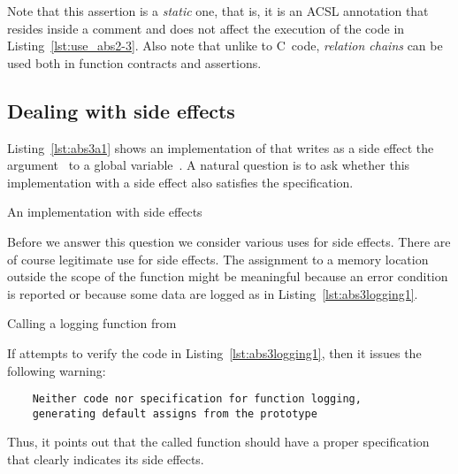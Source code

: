 Note that this assertion is a \emph{static} one, that is, it is
an ACSL annotation that resides inside a comment and does not affect
the execution of the code in Listing~\ref{lst:use_abs2-3}.
Also note that unlike to C~code, \emph{relation chains} can be used both in function
contracts and assertions.

\clearpage

\subsection{Dealing with side effects}

Listing~\ref{lst:abs3a1} shows an implementation of 
that writes as a side effect the argument~ to a global variable~.
A natural question is to ask whether this implementation with a side effect
also satisfies the specification.

\begin{listing}[hbt]
\begin{minipage}{\textwidth}

\end{minipage}
\caption{\label{lst:abs3a1} An implementation with side effects}
\end{listing}

\FloatBarrier

Before we answer this question we consider various uses for side effects.
There are of course legitimate use for side effects.
The assignment to a memory location outside the scope of the function
might be meaningful because an error condition is reported or because
some data are logged as in Listing~\ref{lst:abs3logging1}.

\begin{listing}[hbt]
\begin{minipage}{\textwidth}

\end{minipage}
\caption{\label{lst:abs3logging1} Calling a logging function from }
\end{listing}

If \framacwp attempts to verify the code in Listing~\ref{lst:abs3logging1},
then it issues the following warning:
%
\begin{small}
\begin{verbatim}
    Neither code nor specification for function logging,
    generating default assigns from the prototype
\end{verbatim}
\end{small}
%
Thus, it points out that the called function  should have a proper
specification that clearly indicates its side effects.

